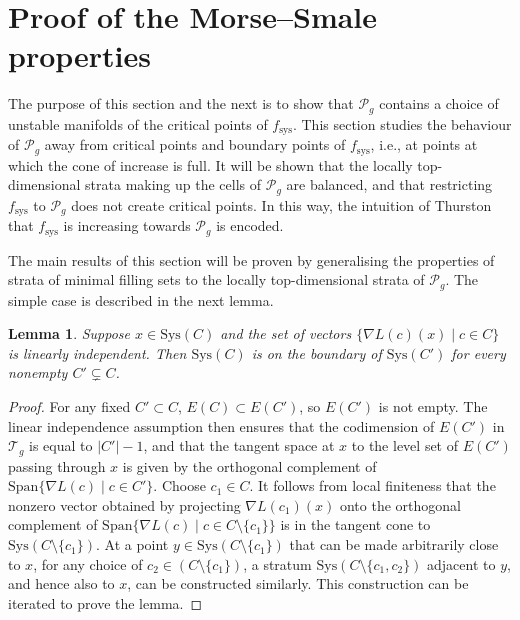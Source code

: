 \documentclass[11pt]{article}
\numberwithin{equation}{section}
\numberwithin{equation}{section}
\newtheorem{Lemma}[Theorem]{Lemma}
\begin{document}
\section{Proof of the Morse--Smale properties}
\label{mainproof}

The purpose of this section and the next is to show that $\mathcal{P}_{g}$ contains a choice of unstable manifolds of the critical points of $f_{\mathrm{sys}}$. This section studies the behaviour of $\mathcal{P}_{g}$ away from critical points and boundary points of $f_{\mathrm{sys}}$, i.e., at points at which the cone of increase is full. It will be shown that the locally top-dimensional strata making up the cells of $\mathcal{P}_{g}$ are balanced, and that restricting $f_{\mathrm{sys}}$ to $\mathcal{P}_{g}$ does not create critical points. In this way, the intuition of Thurston that $f_{\mathrm{sys}}$ is increasing towards $\mathcal{P}_{g}$ is encoded.

The main results of this section will be proven by generalising the properties of strata of minimal filling sets to the locally top-dimensional strata of $\mathcal{P}_{g}$. The simple case is described in the next lemma.

\begin{Lemma}
\label{linearlyindependent}
Suppose $x\in \mathrm{Sys}(C)$ and the set of vectors $\{\nabla L(c)(x) \mid c\in C\}$ is linearly independent. Then $\mathrm{Sys}(C)$ is on the boundary of $\mathrm{Sys}(C')$ for every nonempty $C'\subsetneq C$.
\end{Lemma}
\begin{proof}
For any fixed $C'\subset C$, $E(C)\subset E(C')$, so $E(C')$ is not empty. The linear independence assumption then ensures that the codimension of $E(C')$ in $\mathcal{T}_{g}$ is equal to $|C'|-1$, and that the tangent space at $x$ to the level set of $E(C')$ passing through $x$ is given by the orthogonal complement of $\mathrm{Span}\{\nabla L(c) \mid c\in C'\}$. Choose $c_{1}\in C$. It follows from local finiteness that the nonzero vector obtained by projecting $\nabla L(c_{1})(x)$ onto the orthogonal complement of $\mathrm{Span}\{\nabla L(c) \mid c\in C\setminus \{c_{1}\}\}$ is in the tangent cone to $\mathrm{Sys}(C\setminus\{c_{1}\})$. At a point $y\in \mathrm{Sys}(C\setminus\{c_{1}\})$ that can be made arbitrarily close to $x$, for any choice of $c_{2}\in (C\setminus\{c_{1}\})$, a stratum $\mathrm{Sys}(C\setminus\{c_{1},c_{2}\})$ adjacent to $y$, and hence also to $x$, can be constructed similarly. This construction can be iterated to prove the lemma.
\end{proof}
\end{document}
